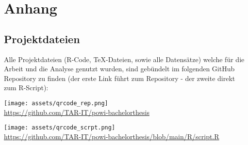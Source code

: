 
\section{Anhang}


\subsection{Projektdateien}

{\footnotesize

    Alle Projektdateien (R-Code, TeX-Dateien, sowie alle Datensätze) welche für die Arbeit und 
    die Analyse genutzt wurden, sind gebündelt im folgenden GitHub Repository zu finden (der 
    erste Link führt zum Repository - der zweite direkt zum R-Script):

    \vspace{1.5cm}

    \begin{center}
        \texttt{[image: assets/qrcode\_rep.png]}\\
        \vspace{.25cm}
        \url{https://github.com/TAR-IT/powi-bachelorthesis}
    \end{center}

    \vspace{1.5cm}

    \begin{center}
        \texttt{[image: assets/qrcode\_scrpt.png]}\\
        \vspace{.25cm}
        \url{https://github.com/TAR-IT/powi-bachelorthesis/blob/main/R/script.R}
    \end{center}

}
